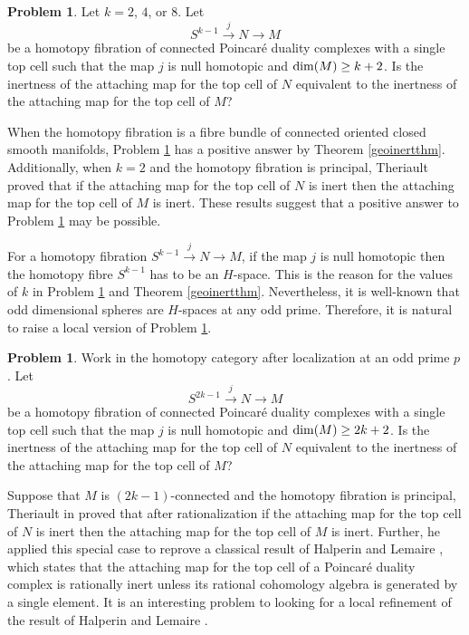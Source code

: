 \documentclass[a4]{amsart}
\theoremstyle{definition}
\newtheorem{problem}[theorem]{Problem}
\begin{document}
\begin{sloppypar}
\begin{problem}\label{geoinert-prop}
Let $k=2$, $4$, or $8$. Let 
\[
S^{k-1}\stackrel{j}{\longrightarrow} N\stackrel{}{\longrightarrow} M
\]
be a homotopy fibration of connected Poincar\'{e} duality complexes with a single top cell such that the map $j$ is null homotopic and ${\rm dim}(M)\geq k+2$. 
Is the inertness of the attaching map for the top cell of $N$ equivalent to the inertness of the attaching map for the top cell of $M$?
\end{problem}
When the homotopy fibration is a fibre bundle of connected oriented closed smooth manifolds, Problem \ref{geoinert-prop} has a positive answer by Theorem \ref{geoinertthm}. Additionally, when $k=2$ and the homotopy fibration is principal, Theriault \cite{The24b} proved that if the attaching map for the top cell of $N$ is inert then the attaching map for the top cell of $M$ is inert. These results suggest that a positive answer to Problem \ref{geoinert-prop} may be possible. 

For a homotopy fibration $S^{k-1}\stackrel{j}{\longrightarrow} N\stackrel{}{\longrightarrow} M$, if the map $j$ is null homotopic then the homotopy fibre $S^{k-1}$ has to be an $H$-space. This is the reason for the values of $k$ in Problem \ref{geoinert-prop} and Theorem \ref{geoinertthm}. Nevertheless, it is well-known that odd dimensional spheres are $H$-spaces at any odd prime. Therefore, it is natural to raise a local version of Problem \ref{geoinert-prop}.   
\begin{problem}\label{kodd-inert-prop}
Work in the homotopy category after localization at an odd prime $p$. 
Let 
\[
S^{2k-1}\stackrel{j}{\longrightarrow} N\stackrel{}{\longrightarrow} M
\]
be a homotopy fibration of connected Poincar\'{e} duality complexes with a single top cell such that the map $j$ is null homotopic and ${\rm dim}(M)\geq 2k+2$. 
Is the inertness of the attaching map for the top cell of $N$ equivalent to the inertness of the attaching map for the top cell of $M$?
\end{problem}
Suppose that $M$ is $(2k-1)$-connected and the homotopy fibration is principal, Theriault in \cite[Theorem 9.1]{The24b} proved that after rationalization if the attaching map for the top cell of $N$ is inert then the attaching map for the top cell of $M$ is inert. Further, he applied this special case to reprove a classical result of Halperin and Lemaire \cite{HL87}, which states that the attaching map for the top cell of a Poincar\'{e} duality complex is rationally inert unless its rational cohomology algebra is generated by a single element. It is an interesting problem to looking for a local refinement of the result of Halperin and Lemaire \cite{HL87}.


\end{sloppypar}
\end{document}
